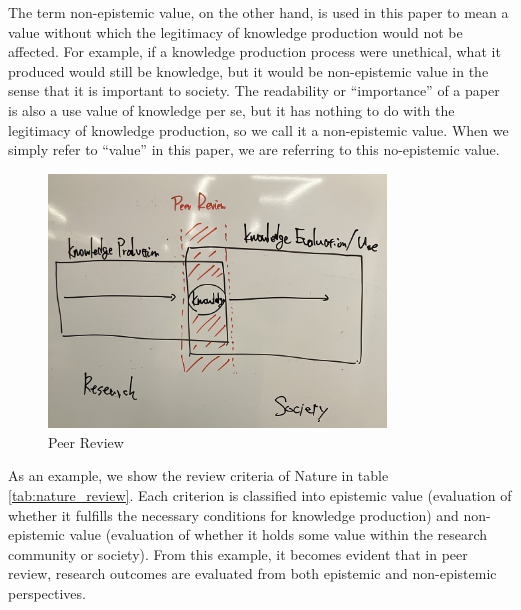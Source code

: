 The term non-epistemic value, on the other hand, is used in this paper to mean a value without which the legitimacy of knowledge production would not be affected. For example, if a knowledge production process were unethical, what it produced would still be knowledge, but it would be non-epistemic value in the sense that it is important to society. The readability or ``importance'' of a paper is also a use value of knowledge per se, but it has nothing to do with the legitimacy of knowledge production, so we call it a non-epistemic value. When we simply refer to ``value'' in this paper, we are referring to this no-epistemic value.

\begin{figure}[htb]
    \centering
    \includegraphics[width=0.8\textwidth]{figs/peer_review.jpg}
    \caption{Peer Review}
    \label{fig:peer_review}
\end{figure}

As an example, we show the review criteria of Nature in table \ref{tab:nature_review}. Each criterion is classified into epistemic value (evaluation of whether it fulfills the necessary conditions for knowledge production) and non-epistemic value (evaluation of whether it holds some value within the research community or society). From this example, it becomes evident that in peer review, research outcomes are evaluated from both epistemic and non-epistemic perspectives. 

